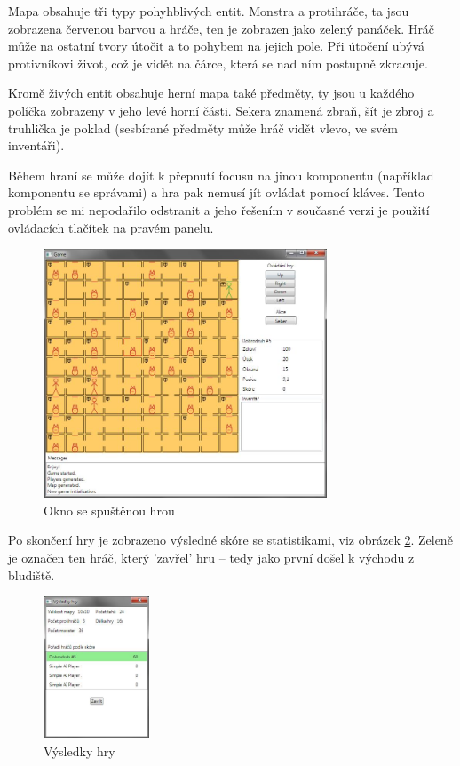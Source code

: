 \documentclass[11pt,a4paper]{scrartcl}
\begin{document}
	Mapa obsahuje tři typy pohyhblivých entit. Monstra a protihráče, ta jsou zobrazena červenou barvou a hráče, ten je zobrazen jako zelený panáček. Hráč může na ostatní tvory útočit a to pohybem na jejich pole. Při útočení ubývá protivníkovi život, což je vidět na čárce, která se nad ním postupně zkracuje.
	
	Kromě živých entit obsahuje herní mapa také předměty, ty jsou u každého políčka zobrazeny v jeho levé horní části. Sekera znamená zbraň, šít je zbroj a truhlička je poklad (sesbírané předměty může hráč vidět vlevo, ve svém inventáři). 
	
	Během hraní se může dojít k přepnutí focusu na jinou komponentu (například komponentu se správami) a hra pak nemusí jít ovládat pomocí kláves. Tento problém se mi nepodařilo odstranit a jeho řešením v současné verzi je použití ovládacích tlačítek na pravém panelu.
	
	\begin{figure}[H]
		\centering
		\includegraphics[height=280px]{game-window}
		\caption{Okno se spuštěnou hrou}
		\label{fig:game-window}
	\end{figure}
	
	
	Po skončení hry je zobrazeno výsledné skóre se statistikami, viz obrázek \ref{fig:game-res-window}. Zeleně je označen ten hráč, který 'zavřel' hru -- tedy jako první došel k východu z bludiště.
	
	\begin{figure}[H]
		\centering
		\includegraphics[height=160px]{score-window}
		\caption{Výsledky hry}
		\label{fig:game-res-window}
	\end{figure}
	
\end{document}
